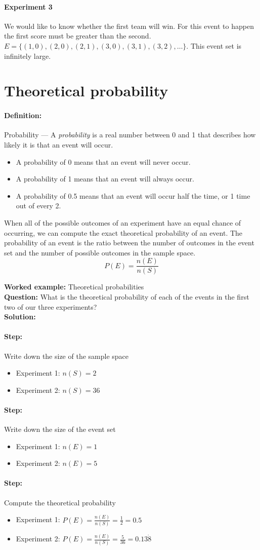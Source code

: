 \documentclass[a4paper,11pt]{report}
\def\Definition#1#2{\paragraph{Definition:} #1 --- #2}
\newenvironment{wex}[3]%
{\textbf{Worked example:} #1 \\
\textbf{Question:} #2 \\
\textbf{Solution:} #3}%
{}
\newcommand{\westep}[1]{\paragraph{Step:} #1}
\begin{document}

\paragraph{Experiment 3} We would like to know whether the first team
will win. For this event to happen the first score must be greater
than the second. \(E=\{(1,0),(2,0),(2,1),(3,0),(3,1),(3,2),\ldots\}\).
This event set is infinitely large.


\section{Theoretical probability}
\Definition{Probability}{A {\em probability} is a real number between
  0 and 1 that describes how likely it is that an event will occur.}
\begin{itemize}
\item A probability of 0 means that an event will never occur.
\item A probability of 1 means that an event will always occur.
\item A probability of 0.5 means that an event will occur half the
  time, or 1 time out of every 2.
\end{itemize}

When all of the possible outcomes of an experiment have an equal
chance of occurring, we can compute the exact theoretical probability
of an event. The probability of an event is the ratio between the
number of outcomes in the event set and the number of possible
outcomes in the sample space.
\[P(E) = \frac{n(E)}{n(S)}\]

\begin{wex}{Theoretical probabilities}{
  What is the theoretical probability of each of the events in the
  first two of our three experiments?
}{
  \westep{Write down the size of the sample space}
  \begin{itemize}
  \item[] Experiment 1: $n(S) = 2$
  \item[] Experiment 2: $n(S) = 36$
  \end{itemize}
  
  \westep{Write down the size of the event set}
  \begin{itemize}
  \item[] Experiment 1: $n(E) = 1$
  \item[] Experiment 2: $n(E) = 5$
  \end{itemize}

  \westep{Compute the theoretical probability}
  \begin{itemize}
  \item[] Experiment 1: $P(E) = \frac{n(E)}{n(S)} = \frac{1}{2} = 0.5$
  \item[] Experiment 2: $P(E) = \frac{n(E)}{n(S)} = \frac{5}{36} = 0.13\dot{8}$
  \end{itemize}
}
\end{wex}
\end{document}
